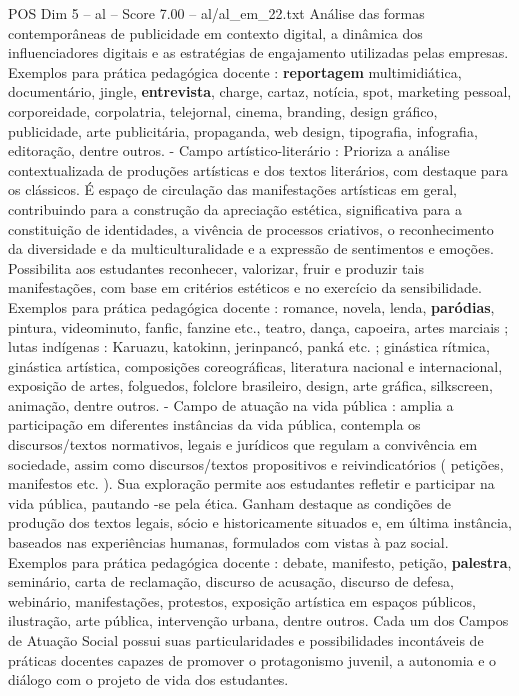 \begin{textsample}{POS Dim 5 – al – Score 7.00 – al/al\_em\_22.txt}
Análise das formas contemporâneas de publicidade em contexto digital, a dinâmica dos influenciadores digitais e as estratégias de engajamento utilizadas pelas empresas.
Exemplos para prática pedagógica docente : \textbf{reportagem} multimidiática, documentário, jingle, \textbf{entrevista}, charge, cartaz, notícia, spot, marketing pessoal, corporeidade, corpolatria, telejornal, cinema, branding, design gráfico, publicidade, arte publicitária, propaganda, web design, tipografia, infografia, editoração, dentre outros. - Campo artístico-literário : Prioriza a análise contextualizada de produções artísticas e dos textos literários, com destaque para os clássicos.
É espaço de circulação das manifestações artísticas em geral, contribuindo para a construção da apreciação estética, significativa para a constituição de identidades, a vivência de processos criativos, o reconhecimento da diversidade e da multiculturalidade e a expressão de sentimentos e emoções.
Possibilita aos estudantes reconhecer, valorizar, fruir e produzir tais manifestações, com base em critérios estéticos e no exercício da sensibilidade.
Exemplos para prática pedagógica docente : romance, novela, lenda, \textbf{paródias}, pintura, videominuto, fanfic, fanzine etc., teatro, dança, capoeira, artes marciais ; lutas indígenas : Karuazu, katokinn, jerinpancó, panká etc. ; ginástica rítmica, ginástica artística, composições coreográficas, literatura nacional e internacional, exposição de artes, folguedos, folclore brasileiro, design, arte gráfica, silkscreen, animação, dentre outros. - Campo de atuação na vida pública : amplia a participação em diferentes instâncias da vida pública, contempla os discursos/textos normativos, legais e jurídicos que regulam a convivência em sociedade, assim como discursos/textos propositivos e reivindicatórios ( petições, manifestos etc. ).
Sua exploração permite aos estudantes refletir e participar na vida pública, pautando -se pela ética.
Ganham destaque as condições de produção dos textos legais, sócio e historicamente situados e, em última instância, baseados nas experiências humanas, formulados com vistas à paz social.
Exemplos para prática pedagógica docente : debate, manifesto, petição, \textbf{palestra}, seminário, carta de reclamação, discurso de acusação, discurso de defesa, webinário, manifestações, protestos, exposição artística em espaços públicos, ilustração, arte pública, intervenção urbana, dentre outros.
Cada um dos Campos de Atuação Social possui suas particularidades e possibilidades incontáveis de práticas docentes capazes de promover o protagonismo juvenil, a autonomia e o diálogo com o projeto de vida dos estudantes.

\end{textsample}

